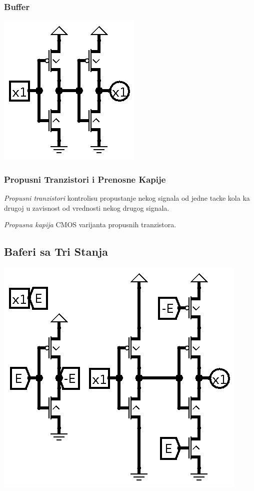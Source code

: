 \documentclass[12p,a4paper]{article}
\begin{document}
\begin{multicols}{2}
    \subsubsection{Buffer}

    \includegraphics[width=0.4\columnwidth]{Figures/mos_buffer.png}

    \subsubsection{Propusni Tranzistori i Prenosne Kapije}

    \emph{Propusni tranzistori} kontrolisu propustanje nekog signala od jedne 
    tacke kola ka drugoj u zavisnost od vrednosti nekog drugog signala.

    \emph{Propusna kapija} CMOS varijanta propusnih tranzistora.

    \subsection{Baferi sa Tri Stanja}

    \includegraphics[width=0.7\columnwidth]{Figures/mos_tristate_buffer.png}
    

\end{multicols}
\end{document}
